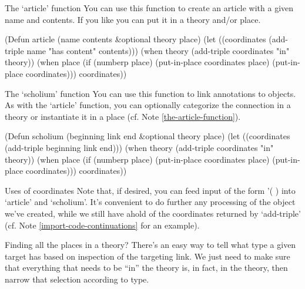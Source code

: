 \begin{notate}{The `article' function} \label{the-article-function}
You can use this function to create an article with a
given name and contents.  If you like you can put it in a
theory and/or place.
\end{notate}

\begin{elisp}
(Defun article (name contents &optional theory place)
  (let ((coordinates (add-triple name
                                 "has content"
                                 contents)))
    (when theory (add-triple coordinates "in" theory))
    (when place (if (numberp place)
                    (put-in-place coordinates place)
                  (put-in-place coordinates)))
    coordinates))
\end{elisp}

\begin{notate}{The `scholium' function} \label{the-scholium-function}
You can use this function to link annotations to objects.
As with the `article' function, you can optionally
categorize the connection in a theory or instantiate it in
a place (cf. Note \ref{the-article-function}).
\end{notate}

\begin{elisp}
(Defun scholium (beginning link end &optional theory place)
  (let ((coordinates (add-triple beginning
                                 link
                                 end)))
    (when theory (add-triple coordinates "in" theory))
    (when place (if (numberp place)
                    (put-in-place coordinates place)
                  (put-in-place coordinates)))
    coordinates))
\end{elisp}

\begin{notate}{Uses of coordinates}
Note that, if desired, you can feed input of the form
'( ) into `article' and `scholium'.
It's convenient to do further any processing of the object
we've created, while we still have ahold of the coordinates
returned by `add-triple' (cf. Note
\ref{import-code-continuations} for an example).
\end{notate}

\begin{notate}{Finding all the places in a theory?}
There's an easy way to tell what type a given target has
based on inspection of the targeting link.  We just need
to make sure that everything that needs to be ``in'' the
theory is, in fact, in the theory, then narrow that
selection according to type.
\end{notate}

